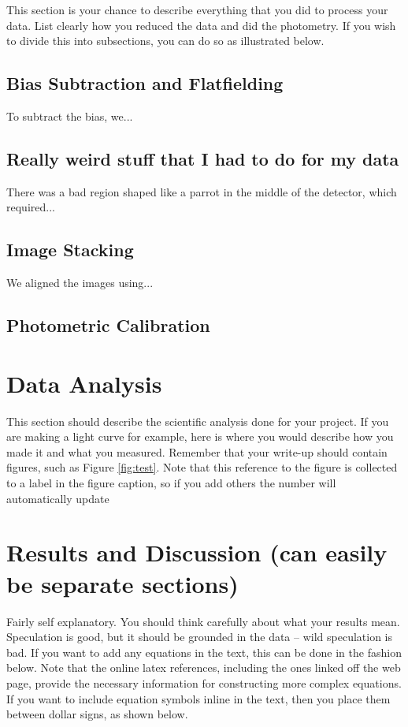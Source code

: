 \documentclass{emulateapj}
\begin{document}
This section is your chance to describe everything that you did to process your data.
List clearly how you reduced the data and did the photometry. If you wish to divide
this into subsections, you can do so as illustrated below.
\subsection{Bias Subtraction and Flatfielding}
To subtract the bias, we...
\subsection{Really weird stuff that I had to do for my data}
There was a bad region shaped like a parrot in the middle of the detector, which required...
\subsection{Image Stacking}
We aligned the images using...
\subsection{Photometric Calibration}

\section{Data Analysis}

This section should describe the scientific analysis done for your project. If you are
making a light curve for example, here is where you would describe how you made it and what you measured.
Remember that your write-up should contain figures, such as Figure \ref{fig:test}. Note that this
reference to the figure is collected to a label in the figure caption, so if you add others the
number will automatically update

\section{Results and Discussion (can easily be separate sections)}

Fairly self explanatory. You should think carefully about what your results 
mean. Speculation is good, but it should be grounded in the data -- wild
speculation is bad.  If you want to add any equations in the text, this
can be done in the fashion below. Note that the online latex references, 
including the ones linked off the web page, provide the necessary information
for constructing more complex equations. If you want to include equation
symbols inline in the text, then you place them between dollar signs, as
shown below.
\end{document}
